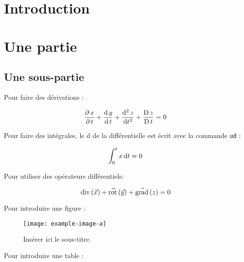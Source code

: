\documentclass[a4paper,12pt,french]{article}
\begin{document}

\thispagestyle{empty}
\tableofcontents


\section{Introduction}






\newpage
\section{Une partie}
\subsection{Une sous-partie}


Pour faire des dérivations :

\[
    \dfrac{\partial\, x}{\partial\, t} + \dfrac{\mathrm{d}\, y}{\mathrm{d}\, t} + \dfrac{\mathrm{d}^2\, z}{\mathrm{d} t^2} + \dfrac{\mathrm{D}\, z}{\mathrm{D}\, t} = 0
\]



Pour faire des intégrales, le d de la différentielle est écrit avec la commande \texttt{ud} :

\[
    \int_0^t x \, \mathrm{d} t = 0
\]



Pour utiliser des opérateurs différentiels:

\[
    \mathrm{div}\left( \vec{x} \right) + \vec{\mathrm{rot}}\left( \vec{y} \right) + \vec{\mathrm{grad}}\left( z \right) = 0
\]




Pour introduire une figure : 

\begin{figure}[ht!]
    \centering
    \texttt{[image: example-image-a]}
    \caption{Insérer ici le sous-titre.}
    \label{fig:id-de-la-figure}
\end{figure}




Pour introduire une table : 
\end{document}
